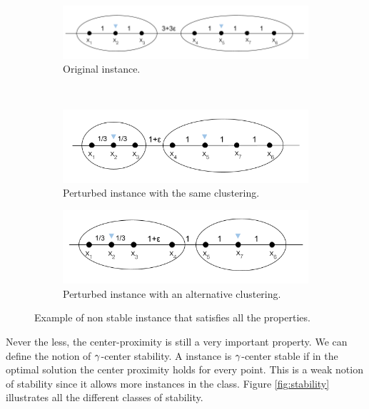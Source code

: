 \begin{figure}[ht]
     \centering
     \begin{subfigure}[b]{0.8\textwidth}
         \centering
         \includegraphics[width=\textwidth]{Images/nonStable1.png}
         \caption{Original instance.}
         \label{fig:originalInstance}
     \end{subfigure}
     \\
     \begin{subfigure}[b]{0.48\textwidth}
         \centering
         \includegraphics[width=\textwidth]{Images/nonStable2.png}
         \caption{Perturbed instance with the same clustering.}
         \label{fig:perOptCluster}
     \end{subfigure}
     \hfill
     \begin{subfigure}[b]{0.48\textwidth}
         \centering
         \includegraphics[width=\textwidth]{Images/nonStable3.png}
         \caption{Perturbed instance with an alternative clustering.}
         \label{fig:diffCluster}
     \end{subfigure}
      \caption{Example of non stable instance that satisfies all the properties.}
        \label{fig:NonStable}
\end{figure}



Never the less, the center-proximity is still a very important property. We can define the notion of $\gamma$-center stability. A instance is $\gamma$-center stable if in the optimal solution the center proximity holds for every point. This is a weak notion of stability since it allows more instances in the class. Figure \ref{fig:stability} illustrates all the different classes of stability.

